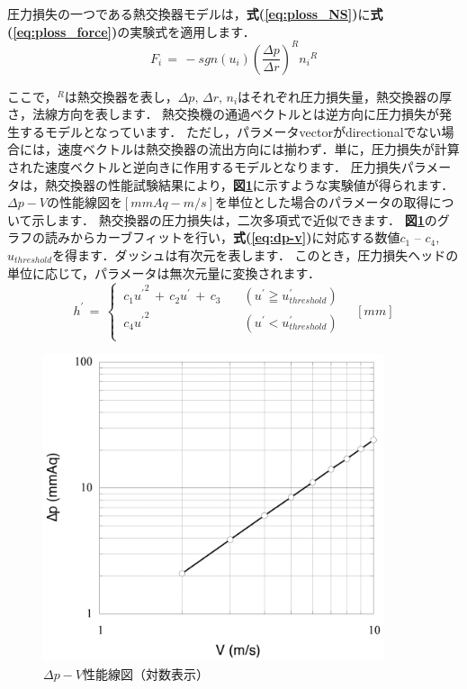 圧力損失の一つである熱交換器モデルは，\textbf{式(\ref{eq:ploss_NS})}に\textbf{式(\ref{eq:ploss_force})}の実験式を適用します．
\begin{equation}
{F}_{i}
\,{=}\,
-sgn \left( u_{i} \right) {\left( \frac{\Delta p}{\Delta r} \right)}^{R} {n_{i}}^{R}
\label{eq:ploss_force}
\end{equation}

\noindent ここで，${}^{R}$は熱交換器を表し，$\Delta p,\,\Delta r,\,n_{i}$はそれぞれ圧力損失量，熱交換器の厚さ，法線方向を表します．
熱交換機の通過ベクトルとは逆方向に圧力損失が発生するモデルとなっています．
ただし，パラメータvectorがdirectionalでない場合には，速度ベクトルは熱交換器の流出方向には揃わず．単に，圧力損失が計算された速度ベクトルと逆向きに作用するモデルとなります．
圧力損失パラメータは，熱交換器の性能試験結果により，\textbf{図\ref{fig:ploss}}に示すような実験値が得られます．
$\Delta p-V$の性能線図を$[mmAq - m/s]$を単位とした場合のパラメータの取得について示します．
熱交換器の圧力損失は，二次多項式で近似できます．
\textbf{図\ref{fig:ploss}}のグラフの読みからカーブフィットを行い，\textbf{式(\ref{eq:dp-v})}に対応する数値$c_{1}$ -- $c_{4}$, $u_{threshold}$を得ます．ダッシュは有次元を表します．
このとき，圧力損失ヘッドの単位に応じて，パラメータは無次元量に変換されます．
\begin{equation}
{h}^{\prime}
\,{=}\,
\begin{cases}
\, c_{1} {u^{\prime}}^{2}\,+\,c_{2}u^{\prime}\,+\,c_{3} & \quad (u^{\prime} \geqq u^{\prime}_{threshold})\\
\, c_{4} {u^{\prime}}^{2} & \quad (u^{\prime}<u^{\prime}_{threshold})\\
\end{cases} \quad [mm]
\label{eq:dp-v}
\end{equation}

\begin{figure}[htdp]
\begin{center}
\includegraphics[width=10cm,clip]{ploss.eps}
\end{center}
\caption{$\Delta p-V$性能線図（対数表示）}
\label{fig:ploss}
\end{figure}

